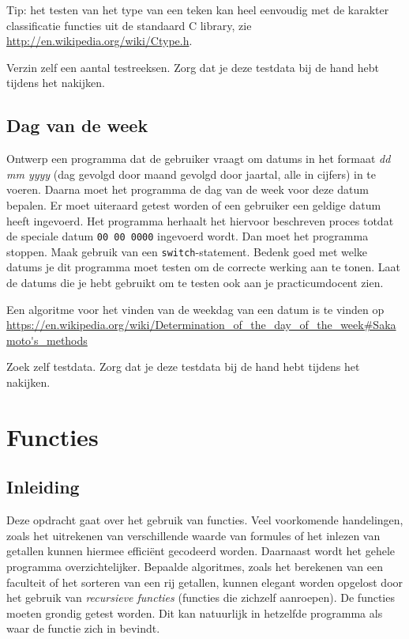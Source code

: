 \documentclass[a4paper,10pt,fleqn,twoside]{article}
\begin{document}
Tip: het testen van het type van een teken kan heel eenvoudig met de karakter classificatie functies uit de standaard C library, zie \url{http://en.wikipedia.org/wiki/Ctype.h}.

Verzin zelf een aantal testreeksen. Zorg dat je deze testdata bij de hand hebt tijdens het nakijken.

\subsection{Dag van de week}
Ontwerp een programma dat de gebruiker vraagt om datums in het formaat \textsl{dd mm yyyy} (dag gevolgd door maand gevolgd door jaartal, alle in cijfers) in te voeren. Daarna moet het programma de dag van de week voor deze datum bepalen. Er moet uiteraard getest worden of een gebruiker een geldige datum heeft ingevoerd. Het programma herhaalt het hiervoor beschreven proces totdat de speciale datum \texttt{00 00 0000} ingevoerd wordt. Dan moet het programma stoppen. Maak gebruik van een \lstinline|switch|-statement. Bedenk goed met welke datums je dit programma moet testen om de correcte werking aan te tonen. Laat de datums die je hebt gebruikt om te testen ook aan je practicumdocent zien.

Een algoritme voor het vinden van de weekdag van een datum is te vinden op \url{https://en.wikipedia.org/wiki/Determination_of_the_day_of_the_week#Sakamoto's_methods}

Zoek zelf testdata. Zorg dat je deze testdata bij de hand hebt tijdens het nakijken.


\section{Functies}

\subsection{Inleiding}
Deze opdracht gaat over het gebruik van functies. Veel voorkomende handelingen, zoals het uitrekenen van verschillende waarde van formules of het inlezen van getallen kunnen hiermee efficiënt gecodeerd worden. Daarnaast wordt het gehele programma overzichtelijker. Bepaalde algoritmes, zoals het berekenen van een faculteit of het sorteren van een rij getallen, kunnen elegant worden opgelost door het gebruik van \textsl{recursieve functies} (functies die zichzelf aanroepen). De functies moeten grondig getest worden. Dit kan natuurlijk in hetzelfde programma als waar de functie zich in bevindt.
\end{document}
